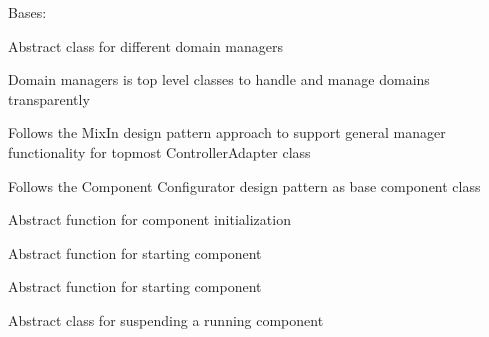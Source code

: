 \documentclass[letterpaper,10pt,english]{sphinxmanual}
\begin{document}
\begin{fulllineitems}
\label{util/adapter:escape.util.adapter.AbstractDomainManager}
Bases: 

Abstract class for different domain managers

Domain managers is top level classes to handle and manage domains
transparently

Follows the MixIn design pattern approach to support general manager
functionality for topmost ControllerAdapter class

Follows the Component Configurator design pattern as base component class

\begin{fulllineitems}
\label{util/adapter:escape.util.adapter.AbstractDomainManager.init}
Abstract function for component initialization

\end{fulllineitems}


\begin{fulllineitems}
\label{util/adapter:escape.util.adapter.AbstractDomainManager.run}
Abstract function for starting component

\end{fulllineitems}


\begin{fulllineitems}
\label{util/adapter:escape.util.adapter.AbstractDomainManager.finit}
Abstract function for starting component

\end{fulllineitems}


\begin{fulllineitems}
\label{util/adapter:escape.util.adapter.AbstractDomainManager.suspend}
Abstract class for suspending a running component

\end{fulllineitems}


\end{fulllineitems}
\end{document}
